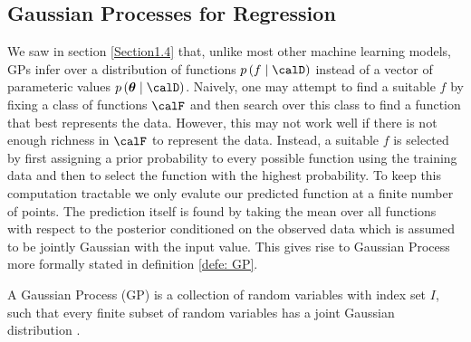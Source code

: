 \subsection{Gaussian Processes for Regression}\label{Section1.5}

We saw in section \ref{Section1.4} that, unlike most other machine learning models, GPs infer over a distribution of functions $p \left( f \mid \calD \right)$ instead of a vector of parameteric values $p \left( \bm{\theta} \mid \calD \right)$. Naively, one may attempt to find a suitable $f$ by fixing a class of functions $\calF$ and then search over this class to find a function that best represents the data. However, this may not work well if there is not enough richness in $\calF$ to represent the data. Instead, a suitable $f$ is selected by first assigning a prior probability to every possible function using the training data and then to select the function with the highest probability. To keep this computation tractable we only evalute our predicted function at a finite number of points. The prediction itself is found by taking the mean over all functions with respect to the posterior conditioned on the observed data which is assumed to be jointly Gaussian with the input value. This gives rise to Gaussian Process more formally stated in definition \ref{defe: GP}.

\begin{defe} \label{defe: GP}
    A Gaussian Process (GP) is a collection of random variables with index set $I$, such that every finite subset of random variables has a joint Gaussian distribution \cite{RasmussenCarlEdward2006Gpfm,MurphyKevinP2012Ml}.
\end{defe}

